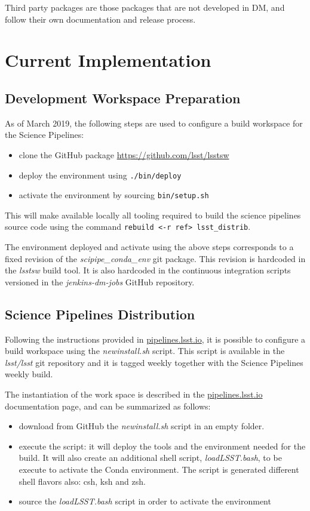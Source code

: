 Third party packages are those packages that are not developed in DM, and follow their own documentation and release process.


\newpage
\section{Current Implementation} \label{sec:actual}

\subsection{Development Workspace Preparation} \label{sec:envset} 
As of March 2019, the following steps are used to configure a build workspace for the Science Pipelines:

\begin{itemize}
\item clone the GitHub package \url{https://github.com/lsst/lsstsw}
\item deploy the environment using \texttt{./bin/deploy}
\item activate the environment by sourcing \texttt{bin/setup.sh}
\end{itemize}

This will make available locally all tooling required to build the science pipelines source code using the command \texttt{rebuild <-r ref> lsst\_distrib}.

The environment deployed and activate using the above steps corresponds to a fixed revision of the \textit{scipipe\_conda\_env} git package.
This revision is hardcoded in the \textit{lsstsw} build tool. It is also hardcoded in the continuous integration scripts versioned in the \textit{jenkins-dm-jobs} GitHub repository.


\subsection{Science Pipelines Distribution} \label{sec:distrib}

Following the instructions provided in \url{pipelines.lsst.io}, it is possible to configure a build workspace using the \textit{newinstall.sh} script.
This script is available in the \textit{lsst/lsst} git repository and it is tagged weekly together with the Science Pipelines weekly build.

The instantiation of the work space is described in the \url{pipelines.lsst.io} documentation page, and can be summarized as follows:

\begin{itemize}
\item download from GitHub the \textit{newinstall.sh} script in an empty folder.
\item execute the script: it will deploy the tools and the environment needed for the build. It will also create an additional shell script, \textit{loadLSST.bash}, to be execute to activate the Conda environment. The script is generated different shell flavors also: csh, ksh and zsh.
\item source the \textit{loadLSST.bash} script in order to activate the environment 
\end{itemize}

